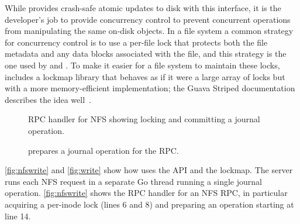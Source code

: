 While \txn provides crash-safe atomic updates to disk with this interface, it is the developer's job
to provide concurrency control to prevent concurrent operations from manipulating
the same on-disk objects. In a file system a common strategy for concurrency
control is to use a per-file lock that protects both the file metadata and any
data blocks associated with the file, and this strategy is the one
used by \gnfs and \simplenfs.
To make it easier for a file system to maintain these locks,
\txn includes a lockmap library that behaves as if it were a large array of
locks but with a more memory-efficient implementation; the
Guava Striped documentation describes the idea well~\cite{guava-striped}.


\begin{figure}
  
  \vspace{-\baselineskip}
  \caption{RPC handler for NFS  showing locking and committing a
    journal operation.}
  \label{fig:nfswrite}
\end{figure}

%   

%  

\begin{figure}
  
  \vspace{-\baselineskip}
  \caption{ prepares a journal operation  for the 
    RPC.}
  \label{fig:write}
\end{figure}

\autoref{fig:nfswrite} and \autoref{fig:write} show how \simplenfs
uses the \txn API and the lockmap.  The server runs each NFS request in a
separate Go thread running a single journal operation. \autoref{fig:nfswrite}
shows the RPC handler for an NFS  RPC, in particular acquiring a
per-inode lock (lines 6 and 8) and preparing an operation starting at line 14.

